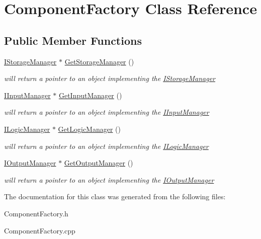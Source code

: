 \hypertarget{class_component_factory}{}\section{Component\+Factory Class Reference}
\label{class_component_factory}
\subsection*{Public Member Functions}
\begin{DoxyCompactItemize}
\item 
\mbox{\label{class_component_factory_aa6178ddfecc39747ef12f11606735e09}} 
\mbox{\hyperlink{class_i_storage_manager}{I\+Storage\+Manager}} $\ast$ \mbox{\hyperlink{class_component_factory_aa6178ddfecc39747ef12f11606735e09}{Get\+Storage\+Manager}} ()
\begin{DoxyCompactList}\small\item\em will return a pointer to an object implementing the \mbox{\hyperlink{class_i_storage_manager}{I\+Storage\+Manager}} \end{DoxyCompactList}\item 
\mbox{\label{class_component_factory_a84613a5a5f11003abd9d10620ca72b5b}} 
\mbox{\hyperlink{class_i_input_manager}{I\+Input\+Manager}} $\ast$ \mbox{\hyperlink{class_component_factory_a84613a5a5f11003abd9d10620ca72b5b}{Get\+Input\+Manager}} ()
\begin{DoxyCompactList}\small\item\em will return a pointer to an object implementing the \mbox{\hyperlink{class_i_input_manager}{I\+Input\+Manager}} \end{DoxyCompactList}\item 
\mbox{\label{class_component_factory_aa8a3b17c86c562cc69f50f283ed3cc28}} 
\mbox{\hyperlink{class_i_logic_manager}{I\+Logic\+Manager}} $\ast$ \mbox{\hyperlink{class_component_factory_aa8a3b17c86c562cc69f50f283ed3cc28}{Get\+Logic\+Manager}} ()
\begin{DoxyCompactList}\small\item\em will return a pointer to an object implementing the \mbox{\hyperlink{class_i_logic_manager}{I\+Logic\+Manager}} \end{DoxyCompactList}\item 
\mbox{\label{class_component_factory_a19583d4fc53d5942e5c0558a52809086}} 
\mbox{\hyperlink{class_i_output_manager}{I\+Output\+Manager}} $\ast$ \mbox{\hyperlink{class_component_factory_a19583d4fc53d5942e5c0558a52809086}{Get\+Output\+Manager}} ()
\begin{DoxyCompactList}\small\item\em will return a pointer to an object implementing the \mbox{\hyperlink{class_i_output_manager}{I\+Output\+Manager}} \end{DoxyCompactList}\end{DoxyCompactItemize}


The documentation for this class was generated from the following files\+:\begin{DoxyCompactItemize}
\item 
Component\+Factory.\+h\item 
Component\+Factory.\+cpp\end{DoxyCompactItemize}
